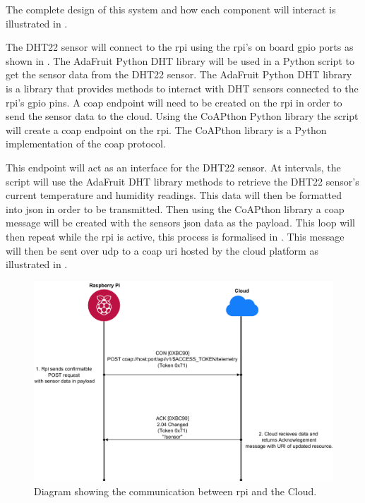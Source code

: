 The complete design of this system and how each component will interact
is illustrated in .

The DHT22 sensor will connect to the \gls{rpi} using the \gls{rpi}'s on board 
\gls{gpio} ports as shown in . 
The AdaFruit Python DHT library will be used in a Python script to get the 
sensor data from the DHT22 sensor.
The AdaFruit Python DHT library is a library that provides methods to interact 
with DHT sensors connected to the \gls{rpi}'s \gls{gpio} pins.
A \gls{coap} endpoint will need to be created on the \gls{rpi} in order to 
send the sensor data to the cloud. 
Using the CoAPthon Python library the script will create a \gls{coap} 
endpoint on the \gls{rpi}.
The CoAPthon library is a Python implementation of the \gls{coap} protocol.

\begin{center}
    
\end{center}

This endpoint will act as an interface for the DHT22 sensor. 
At intervals, the script will use the AdaFruit DHT library 
\citep{adafruit_adafruit_python_dht_2018} methods to retrieve 
the DHT22 sensor's current temperature and humidity readings. 
This data will then be formatted into \gls{json}
in order to be transmitted.
Then using the CoAPthon \citep{tanganelli_coapthon_2015, tanganelli_coapthon3_2018} library a \gls{coap} 
message will be created with the sensors \gls{json} data as the payload. 
This loop will then repeat while the \gls{rpi} is active, this process is 
formalised in .
This message will then be sent over \gls{udp} to a \gls{coap} \gls{uri} 
hosted by the cloud platform as illustrated in .

\begin{figure}[H]
    \centering
    \includegraphics[width=\imageWidth\textwidth]{assets/rpi_cloud_communication.png}
    \caption{\label{fig:rpi_cloud_comms} Diagram showing the communication between \gls{rpi} and the Cloud.}
\end{figure}

